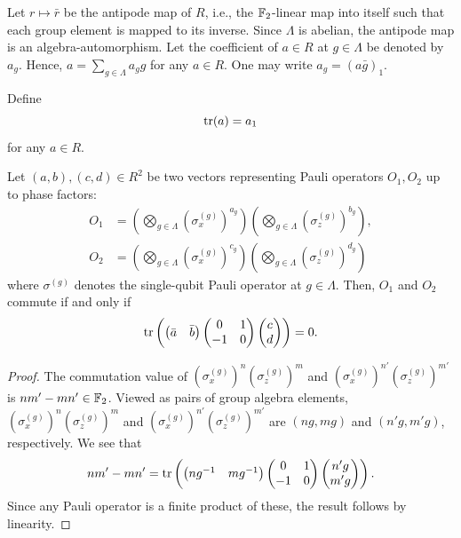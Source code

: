Let $r \mapsto \bar r$ be the antipode map of $R$, 
i.e., the $\mathbb{F}_2$-linear map into itself 
such that each group element is mapped to its inverse.
Since $\Lambda$ is abelian, the antipode map is an algebra-automorphism.
Let the coefficient of $a \in R$ at $g \in \Lambda$ be denoted by $a_g$.
Hence, $a = \sum_{g \in \Lambda} a_g g$ for any $a \in R$.
One may write $a_g = (a \bar g)_1$.

Define
\[
 \mathop{\mathrm{tr}}\nolimits(a) = a_1
\]
for any $a \in R$.
\begin{prop}
Let $(a,b), (c,d) \in R^2$ be two vectors representing Pauli operators $O_1, O_2$ up to phase factors:
\begin{align*}
 O_1 &= \left( \bigotimes_{g \in \Lambda} (\sigma_x^{(g)})^{a_g} \right) 
       \left( \bigotimes_{g \in \Lambda} (\sigma_z^{(g)})^{b_g} \right) ,
\\
 O_2 &= \left( \bigotimes_{g \in \Lambda} (\sigma_x^{(g)})^{c_g} \right) 
       \left( \bigotimes_{g \in \Lambda} (\sigma_z^{(g)})^{d_g} \right) 
\end{align*}
where $\sigma^{(g)}$ denotes the single-qubit Pauli operator at $g \in \Lambda$.
Then, $O_1$ and $O_2$ commute if and only if  
\[
 \mathop{\mathrm{tr}}\nolimits \left(
\begin{pmatrix} \bar a & \bar b \end{pmatrix}
\begin{pmatrix} 0 & 1 \\ -1 & 0 \end{pmatrix}
\begin{pmatrix} c \\ d \end{pmatrix}
\right) = 0 .
\]
\label{prop:trace-formula-commutation-value}
\end{prop}
\begin{proof}
The commutation value of $(\sigma_x^{(g)})^{n} (\sigma_z^{(g)})^{m}$
and $(\sigma_x^{(g)})^{n'} (\sigma_z^{(g)})^{m'}$
is $nm' - mn' \in \mathbb{F}_2$.
Viewed as pairs of group algebra elements,
$(\sigma_x^{(g)})^{n} (\sigma_z^{(g)})^{m}$
and $(\sigma_x^{(g)})^{n'} (\sigma_z^{(g)})^{m'}$
are $(n g, m g)$ and $(n' g, m' g)$, respectively.
We see that
\[
 nm' - mn' =  \mathop{\mathrm{tr}}\nolimits \left(
\begin{pmatrix} n g^{-1} &  m g^{-1} \end{pmatrix}
\begin{pmatrix} 0 & 1 \\ -1 & 0 \end{pmatrix}
\begin{pmatrix} n' g \\ m' g \end{pmatrix}
\right) .
\]
Since any Pauli operator is a finite product of these,
the result follows by linearity.
\end{proof}

